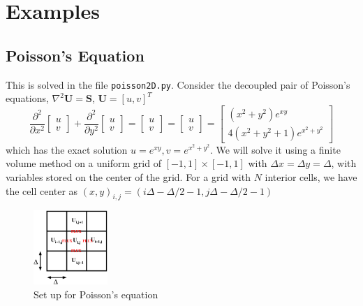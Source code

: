 \documentclass[11pt]{article}
\begin{document}
\section{Examples}

\subsection{Poisson's Equation}

This is solved in the file \lstinline{poisson2D.py}. Consider the decoupled pair of Poisson's equations, $\nabla^2 \mathbf{U} = \mathbf{S}$, $\mathbf{U} = [u,v]^T$
\begin{equation}
\frac{\partial^2}{\partial x^2}\left[ \begin{array}{c} u \\ v \end{array}\right] + \frac{\partial^2}{\partial y^2}\left[ \begin{array}{c} u \\ v \end{array}\right] = \left[ \begin{array}{c} u \\ v \end{array}\right] = \left[ \begin{array}{c} u \\ v \end{array}\right] = \left[ \begin{array}{c} (x^2+y^2)e^{xy} \\ 4(x^2+y^2+1)e^{x^2+y^2}  \end{array}\right]
\end{equation}
which has the exact solution $u = e^{xy}, v = e^{x^2+y^2}$. We will solve it using a finite volume method on a uniform grid of $[-1,1]\times[-1,1]$ with $\Delta x = \Delta y = \Delta$, with variables stored on the center of the grid. For a grid with $N$ interior cells, we have the cell center as $(x,y)_{i,j} = (i\Delta-\Delta/2-1, j\Delta-\Delta/2-1)$
\begin{figure}
\centering
\includegraphics[width=0.25\textwidth]{poisson.pdf}
\caption{Set up for Poisson's equation}
\end{figure}
\end{document}
